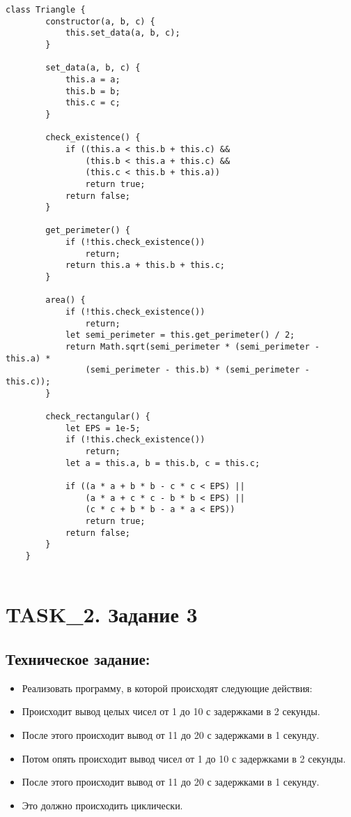 \begin{lstlisting}[label=some-code,caption=Код программы. Задание 1.]
	class Triangle {
		constructor(a, b, c) {
			this.set_data(a, b, c);
		}
	
		set_data(a, b, c) {
			this.a = a;
			this.b = b;
			this.c = c;
		}
	
		check_existence() {
			if ((this.a < this.b + this.c) &&
				(this.b < this.a + this.c) &&
				(this.c < this.b + this.a))
				return true;
			return false;
		}
	
		get_perimeter() {
			if (!this.check_existence())
				return;
			return this.a + this.b + this.c;
		}
	
		area() {
			if (!this.check_existence())
				return;
			let semi_perimeter = this.get_perimeter() / 2;
			return Math.sqrt(semi_perimeter * (semi_perimeter - this.a) *
				(semi_perimeter - this.b) * (semi_perimeter - this.c));
		}
	
		check_rectangular() {
			let EPS = 1e-5;
			if (!this.check_existence())
				return;
			let a = this.a, b = this.b, c = this.c;
	
			if ((a * a + b * b - c * c < EPS) ||
				(a * a + c * c - b * b < EPS) ||
				(c * c + b * b - a * a < EPS))
				return true;
			return false;
		}
	}
	
\end{lstlisting}


\chapter{TASK\_2. Задание 3}

\section{Техническое задание:}

\begin{itemize}
	\item Реализовать программу, в которой происходят следующие действия:
	\item Происходит вывод целых чисел от 1 до 10 с задержками в 2 секунды.
	\item После этого происходит вывод от 11 до 20 с задержками в 1 секунду.
	\item Потом опять происходит вывод чисел от 1 до 10 с задержками в 2 секунды.
	\item После этого происходит вывод от 11 до 20 с задержками в 1 секунду.
	\item Это должно происходить циклически.
\end{itemize}



